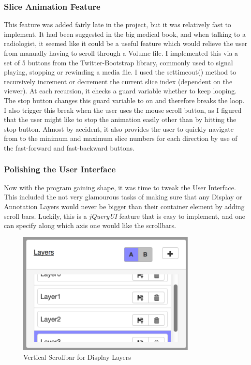 \documentclass[a4paper,11pt,twoside]{article}
\begin{document}
\subsubsection{Slice Animation Feature}

This feature was added fairly late in the project, but it was relatively fast to implement. It had been suggested in the big medical book, and when talking to a radiologist, it seemed like it could be a useful feature which would relieve the user from manually having to scroll through a Volume file. I implemented this via a set of 5 buttons from the Twitter-Bootstrap library, commonly used to signal playing, stopping or rewinding a media file. I used the settimeout() method to recursively increment or decrement the current slice index (dependent on the viewer). At each recursion, it checks a guard variable whether to keep looping. The stop button changes this guard variable to on and therefore breaks the loop. I also trigger this break when the user uses the mouse scroll button, as I figured that the user might like to stop the animation easily other than by hitting the stop button. Almost by accident, it also provides the user to quickly navigate from to the minimum and maximum slice numbers for each direction by use of the fast-forward and fast-backward buttons.


\subsubsection{Polishing the User Interface}

Now with the program gaining shape, it was time to tweak the User Interface. This included the not very glamourous tasks of making sure that any Display or Annotation Layers would never be bigger than their container element by adding scroll bars. Luckily, this is a \textit{jQueryUI} feature that is easy to implement, and one can specify along which axis one would like the scrollbars.

\begin{figure}[ht!]
\centering
\includegraphics[width=90mm]{graphics/scrollbar_01.png}
\caption{Vertical Scrollbar for Display Layers}
\label{fig:UIdesign1}
\end{figure}
\end{document}
